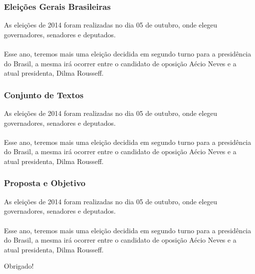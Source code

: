 
\begin{frame}
\frametitle{Eleições Gerais Brasileiras}
As eleições de 2014 foram realizadas no dia 05 de outubro, onde elegeu governadores, senadores e deputados.
\\~\\
Esse ano, teremos mais uma eleição decidida em segundo turno para a presidência do Brasil, a mesma irá ocorrer entre o candidato de oposição Aécio Neves e a atual presidenta, Dilma Rousseff.
\end{frame}


\begin{frame}
\frametitle{Conjunto de Textos}
As eleições de 2014 foram realizadas no dia 05 de outubro, onde elegeu governadores, senadores e deputados.
\\~\\
Esse ano, teremos mais uma eleição decidida em segundo turno para a presidência do Brasil, a mesma irá ocorrer entre o candidato de oposição Aécio Neves e a atual presidenta, Dilma Rousseff.
\end{frame}


\begin{frame}
\frametitle{Proposta e Objetivo}
As eleições de 2014 foram realizadas no dia 05 de outubro, onde elegeu governadores, senadores e deputados.
\\~\\
Esse ano, teremos mais uma eleição decidida em segundo turno para a presidência do Brasil, a mesma irá ocorrer entre o candidato de oposição Aécio Neves e a atual presidenta, Dilma Rousseff.
\end{frame}


\begin{frame}
\Huge{\centerline{Obrigado!}}
\end{frame}


 